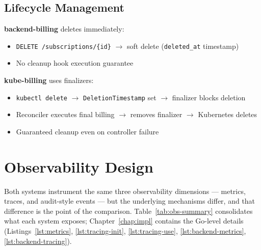 \subsection{Lifecycle Management}

\textbf{backend-billing} deletes immediately:
\begin{itemize}
    \item \texttt{DELETE /subscriptions/\{id\}} $\to$ soft delete (\texttt{deleted\_at} timestamp)
    \item No cleanup hook execution guarantee
\end{itemize}

\textbf{kube-billing} uses finalizers:
\begin{itemize}
    \item \texttt{kubectl delete} $\to$ \texttt{DeletionTimestamp} set $\to$ finalizer blocks deletion
    \item Reconciler executes final billing $\to$ removes finalizer $\to$ Kubernetes deletes
    \item Guaranteed cleanup even on controller failure
\end{itemize}

\section{Observability Design}\label{sec:obs-design}

Both systems instrument the same three observability dimensions --- metrics, traces, and audit-style events --- but the underlying mechanisms differ, and that difference is the point of the comparison. Table~\ref{tab:obs-summary} consolidates what each system exposes; Chapter~\ref{chap:impl} contains the Go-level details (Listings~\ref{lst:metrics}, \ref{lst:tracing-init}, \ref{lst:tracing-use}, \ref{lst:backend-metrics}, \ref{lst:backend-tracing}).

